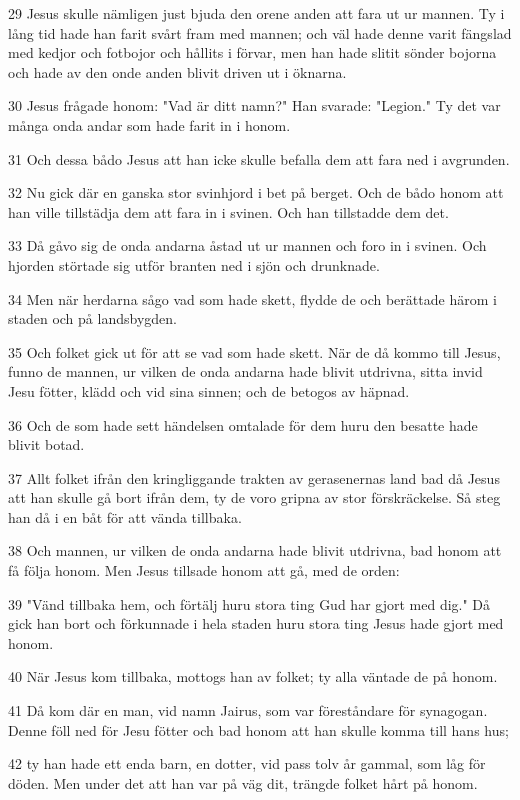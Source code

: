\par 29 Jesus skulle nämligen just bjuda den orene anden att fara ut ur mannen. Ty i lång tid hade han farit svårt fram med mannen; och väl hade denne varit fängslad med kedjor och fotbojor och hållits i förvar, men han hade slitit sönder bojorna och hade av den onde anden blivit driven ut i öknarna.
\par 30 Jesus frågade honom: "Vad är ditt namn?" Han svarade: "Legion." Ty det var många onda andar som hade farit in i honom.
\par 31 Och dessa bådo Jesus att han icke skulle befalla dem att fara ned i avgrunden.
\par 32 Nu gick där en ganska stor svinhjord i bet på berget. Och de bådo honom att han ville tillstädja dem att fara in i svinen. Och han tillstadde dem det.
\par 33 Då gåvo sig de onda andarna åstad ut ur mannen och foro in i svinen. Och hjorden störtade sig utför branten ned i sjön och drunknade.
\par 34 Men när herdarna sågo vad som hade skett, flydde de och berättade härom i staden och på landsbygden.
\par 35 Och folket gick ut för att se vad som hade skett. När de då kommo till Jesus, funno de mannen, ur vilken de onda andarna hade blivit utdrivna, sitta invid Jesu fötter, klädd och vid sina sinnen; och de betogos av häpnad.
\par 36 Och de som hade sett händelsen omtalade för dem huru den besatte hade blivit botad.
\par 37 Allt folket ifrån den kringliggande trakten av gerasenernas land bad då Jesus att han skulle gå bort ifrån dem, ty de voro gripna av stor förskräckelse. Så steg han då i en båt för att vända tillbaka.
\par 38 Och mannen, ur vilken de onda andarna hade blivit utdrivna, bad honom att få följa honom. Men Jesus tillsade honom att gå, med de orden:
\par 39 "Vänd tillbaka hem, och förtälj huru stora ting Gud har gjort med dig." Då gick han bort och förkunnade i hela staden huru stora ting Jesus hade gjort med honom.
\par 40 När Jesus kom tillbaka, mottogs han av folket; ty alla väntade de på honom.
\par 41 Då kom där en man, vid namn Jairus, som var föreståndare för synagogan. Denne föll ned för Jesu fötter och bad honom att han skulle komma till hans hus;
\par 42 ty han hade ett enda barn, en dotter, vid pass tolv år gammal, som låg för döden. Men under det att han var på väg dit, trängde folket hårt på honom.
